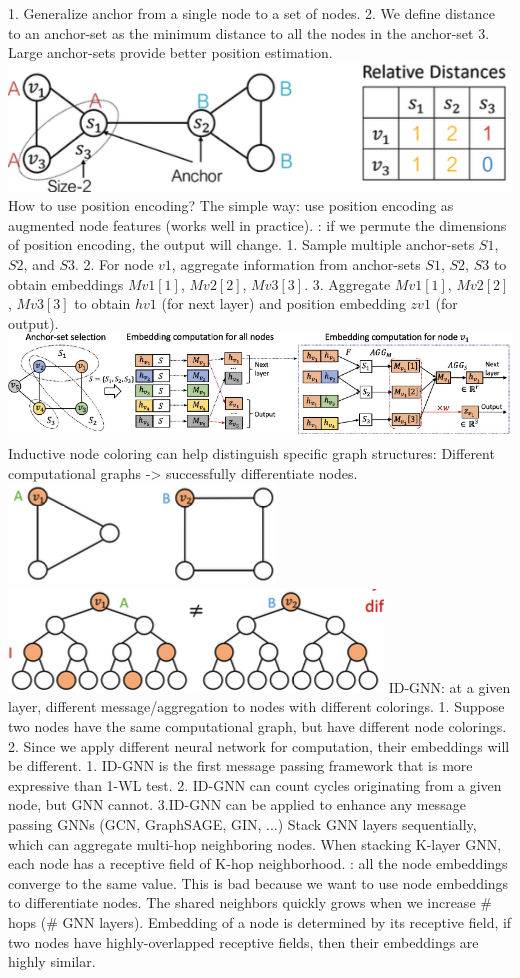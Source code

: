 1. Generalize anchor from a single node to a set of nodes. 2. We define distance to an anchor-set as the minimum distance to all the nodes in the anchor-set 3. Large anchor-sets provide better position estimation.
\includegraphics[height=0.03\textwidth]{figs/l6-2.png} How to use position encoding? The simple way: use position encoding as augmented node features (works well in practice). 
: if we permute the dimensions of position encoding, the output will change.
 1. Sample multiple anchor-sets \( S1 \), \( S2 \), and \( S3 \). 2. For node \( v1 \), aggregate information from anchor-sets \( S1 \), \( S2 \), \( S3 \) to obtain embeddings \( Mv1[1] \), \( Mv2[2] \), \( Mv3[3] \). 3. Aggregate \( Mv1[1] \), \( Mv2[2] \), \( Mv3[3] \) to obtain \( hv1 \) (for next layer) and position embedding \( zv1 \) (for output).
\includegraphics[height=0.035\textwidth]{figs/l6-3.png}
 Inductive node coloring can help distinguish specific graph structures: Different computational graphs -> successfully differentiate nodes.
\includegraphics[height=0.025\textwidth]{figs/l6-4.png}
\includegraphics[height=0.025\textwidth]{figs/l6-5.png}
 ID-GNN: at a given layer, different message/aggregation to nodes with different colorings.
1. Suppose two nodes have the same computational
graph, but have different node colorings. 2. Since we apply different neural network for computation, their embeddings will be different.
 1. ID-GNN is the first message passing framework that is more expressive than 1-WL test. 2. ID-GNN can count cycles originating from a given node, but GNN cannot. 3.ID-GNN can be applied to enhance any message passing GNNs (GCN, GraphSAGE, GIN, ...)
 Stack GNN layers sequentially, which can aggregate multi-hop neighboring nodes. When stacking K-layer GNN, each node has a receptive field of K-hop neighborhood.
: all the node embeddings converge to the same value. This is bad because we want to use node embeddings to differentiate nodes.  The shared neighbors quickly grows when we increase \# hops (\# GNN layers). Embedding of a node is determined by its receptive field, if two nodes have highly-overlapped receptive fields, then their embeddings are highly similar.
